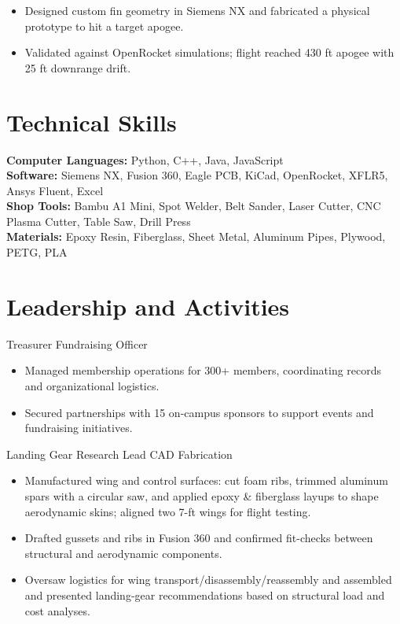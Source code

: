 \begin{itemize}
  \item Designed custom fin geometry in Siemens NX and fabricated a physical prototype to hit a target apogee.
  \item Validated against OpenRocket simulations; flight reached 430 ft apogee with 25 ft downrange drift.
\end{itemize}

\section{Technical Skills}
\textbf{Computer Languages:} Python, C++, Java, JavaScript\\
\textbf{Software:} Siemens NX, Fusion 360, Eagle PCB, KiCad, OpenRocket, XFLR5, Ansys Fluent, Excel\\
\textbf{Shop Tools:} Bambu A1 Mini, Spot Welder, Belt Sander, Laser Cutter, CNC Plasma Cutter, Table Saw, Drill Press\\
\textbf{Materials:} Epoxy Resin, Fiberglass, Sheet Metal, Aluminum Pipes, Plywood, PETG, PLA

\section{Leadership and Activities}

Treasurer \textbar{} Fundraising Officer
\begin{itemize}
  \item Managed membership operations for 300+ members, coordinating records and organizational logistics.
  \item Secured partnerships with 15 on-campus sponsors to support events and fundraising initiatives.
\end{itemize}
\entrygap

Landing Gear Research Lead \textbar{} CAD \textbar{} Fabrication
\begin{itemize}
  \item Manufactured wing and control surfaces: cut foam ribs, trimmed aluminum spars with a circular saw, and applied epoxy \& fiberglass layups to shape aerodynamic skins; aligned two 7-ft wings for flight testing.
  \item Drafted gussets and ribs in Fusion 360 and confirmed fit-checks between structural and aerodynamic components.
  \item Oversaw logistics for wing transport/disassembly/reassembly and assembled and presented landing-gear recommendations based on structural load and cost analyses.
\end{itemize}


